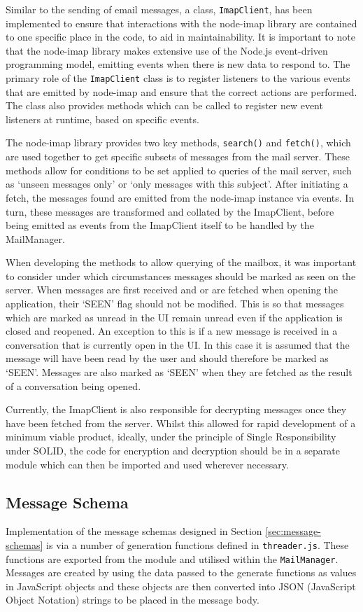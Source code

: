 Similar to the sending of email messages, a class, \verb|ImapClient|, has been implemented to ensure that interactions with the node-imap library are contained to one specific place in the code, to aid in maintainability. It is important to note that the node-imap library makes extensive use of the Node.js event-driven programming model, emitting events when there is new data to respond to. The primary role of the \verb|ImapClient| class is to register listeners to the various events that are emitted by node-imap and ensure that the correct actions are performed. The class also provides methods which can be called to register new event listeners at runtime, based on specific events.

The node-imap library provides two key methods, \verb|search()| and \verb|fetch()|, which are used together to get specific subsets of messages from the mail server. These methods allow for conditions to be set applied to queries of the mail server, such as `unseen messages only' or `only messages with this subject'. After initiating a fetch, the messages found are emitted from the node-imap instance via events. In turn, these messages are transformed and collated by the ImapClient, before being emitted as events from the ImapClient itself to be handled by the MailManager.

When developing the methods to allow querying of the mailbox, it was important to consider under which circumstances messages should be marked as seen on the server. When messages are first received and or are fetched when opening the application, their `SEEN' flag should not be modified. This is so that messages which are marked as unread in the UI remain unread even if the application is closed and reopened. An exception to this is if a new message is received in a conversation that is currently open in the UI. In this case it is assumed that the message will have been read by the user and should therefore be marked as `SEEN'. Messages are also marked as `SEEN' when they are fetched as the result of a conversation being opened. 

Currently, the ImapClient is also responsible for decrypting messages once they have been fetched from the server. Whilst this allowed for rapid development of a minimum viable product, ideally, under the principle of Single Responsibility under SOLID, the code for encryption and decryption should be in a separate module which can then be imported and used wherever necessary.

\subsection{Message Schema}\label{sec:message-schema-implementation}
Implementation of the message schemas designed in Section \ref{sec:message-schemas} is via a number of generation functions defined in \verb|threader.js|. These functions are exported from the module and utilised within the \verb|MailManager|. Messages are created by using the data passed to the generate functions as values in  JavaScript objects and these objects are then converted into JSON (JavaScript Object Notation) strings to be placed in the message body. 

